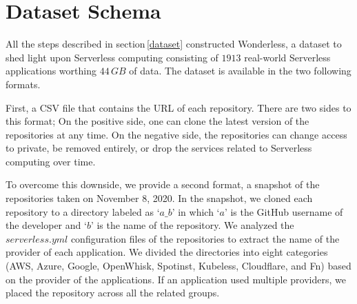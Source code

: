 \section{Dataset Schema}
\label{schema}

All the steps described in section\,\ref{dataset} constructed Wonderless, 
a dataset to shed light upon Serverless computing consisting of $1913$
real-world Serverless applications worthing $44 \, GB$ of data. The dataset 
is available in the two following formats.

First, a CSV file that contains the URL of each repository. There are two 
sides to this format; On the positive side, one can clone the latest version 
of the repositories at any time. On the negative side, the repositories can 
change access to private, be removed entirely, or drop the services related 
to Serverless computing over time.

To overcome this downside, we provide a second format, a snapshot of the 
repositories taken on November 8, 2020. In the snapshot, we cloned each 
repository to a directory labeled as `$a\_b$' in which `$a$' is the GitHub 
username of the developer and `$b$' is the name of the repository. 
We analyzed the $serverless.yml$ configuration files of the repositories 
to extract the name of the provider of each application. We divided the 
directories into eight categories\,(AWS, Azure, Google, OpenWhisk, Spotinst, 
Kubeless, Cloudflare, and Fn) based on the provider of the applications. 
If an application used multiple providers, we placed the repository across 
all the related groups. 
